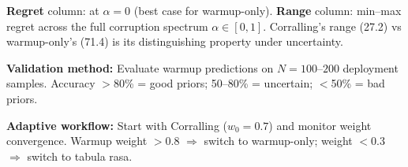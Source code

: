 \begin{table}[t]
\vspace{0.5em}
\small
\textbf{Regret} column: at $\alpha{=}0$ (best case for warmup-only).
\textbf{Range} column: min--max regret across the full corruption
spectrum $\alpha \in [0, 1]$.
Corralling's range (27.2) vs warmup-only's (71.4)
is its distinguishing property under uncertainty.

\textbf{Validation method:}
Evaluate warmup predictions on $N{=}100$--$200$ deployment samples.
Accuracy $>$80\% = good priors; 50--80\% = uncertain; $<$50\% = bad priors.

\textbf{Adaptive workflow:}
Start with Corralling ($w_0{=}0.7$) and monitor weight convergence.
Warmup weight $>$0.8 $\Rightarrow$ switch to warmup-only;
weight $<$0.3 $\Rightarrow$ switch to tabula rasa.
\end{table}
